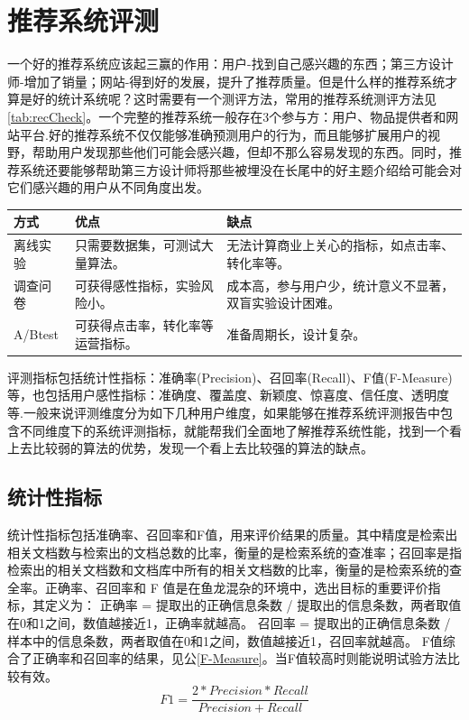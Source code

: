 	\section{推荐系统评测}
		一个好的推荐系统应该起三赢的作用：用户-找到自己感兴趣的东西；第三方设计师-增加了销量；网站-得到好的发展，提升了推荐质量。但是什么样的推荐系统才算是好的统计系统呢？这时需要有一个测评方法，常用的推荐系统测评方法见\autoref{tab:recCheck}。一个完整的推荐系统一般存在3个参与方：用户、物品提供者和网站平台.好的推荐系统不仅仅能够准确预测用户的行为，而且能够扩展用户的视野，帮助用户发现那些他们可能会感兴趣，但却不那么容易发现的东西。同时，推荐系统还要能够帮助第三方设计师将那些被埋没在长尾中的好主题介绍给可能会对它们感兴趣的用户从不同角度出发。
		\begin{table}[htp]
		\centering
		\label{tab:recCheck}
		\begin{tabular}{|l|l|p{5cm}|} \hline
		 方式 & 优点 & 缺点 \\ \hline
		 离线实验 & 只需要数据集，可测试大量算法。 & 无法计算商业上关心的指标，如点击率、转化率等。 \\ \hline
		 调查问卷 & 可获得感性指标，实验风险小。 & 成本高，参与用户少，统计意义不显著，双盲实验设计困难。 \\ \hline
		 A/Btest & 可获得点击率，转化率等运营指标。& 准备周期长，设计复杂。 \\ \hline
		\end{tabular}
		\end{table}


		评测指标包括统计性指标：准确率(Precision)、召回率(Recall)、F值(F-Measure)等，也包括用户感性指标：准确度、覆盖度、新颖度、惊喜度、信任度、透明度等.一般来说评测维度分为如下几种用户维度，如果能够在推荐系统评测报告中包含不同维度下的系统评测指标，就能帮我们全面地了解推荐系统性能，找到一个看上去比较弱的算法的优势，发现一个看上去比较强的算法的缺点。

		\subsection{统计性指标}
			统计性指标包括准确率、召回率和F值，用来评价结果的质量。其中精度是检索出相关文档数与检索出的文档总数的比率，衡量的是检索系统的查准率；召回率是指检索出的相关文档数和文档库中所有的相关文档数的比率，衡量的是检索系统的查全率。正确率、召回率和 F 值是在鱼龙混杂的环境中，选出目标的重要评价指标，其定义为：
			正确率 = 提取出的正确信息条数 /  提取出的信息条数，两者取值在0和1之间，数值越接近1，正确率就越高。
			召回率 = 提取出的正确信息条数 /  样本中的信息条数，两者取值在0和1之间，数值越接近1，召回率就越高。
			F值综合了正确率和召回率的结果，见公\autoref{F-Measure}。当F值较高时则能说明试验方法比较有效。
			\begin{equation}
				F1 = \frac{2*Precision*Recall}{Precision+Recall}
				\label{F-Measure}
			\end{equation}

